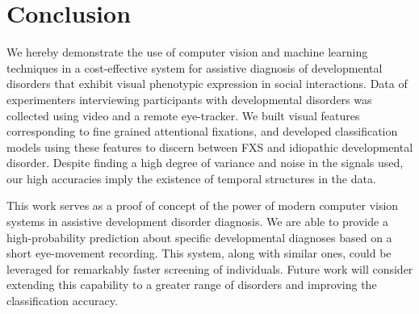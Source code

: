 \documentclass{llncs}
\begin{document}
\vspace*{-\baselineskip}
\section{Conclusion}
\vspace*{-\baselineskip}
We hereby demonstrate the use of computer vision and machine learning techniques in a cost-effective system for assistive diagnosis of developmental disorders that exhibit visual phenotypic expression in social interactions. Data of experimenters interviewing participants with developmental disorders was collected using video and a remote eye-tracker. We built visual features corresponding to fine grained attentional fixations, and developed classification models using these features to discern between FXS and idiopathic developmental disorder. Despite finding a high degree of variance and noise in the signals used, our high accuracies imply the existence of temporal structures in the data.

This work serves as a proof of concept of the power of modern computer vision systems in assistive development disorder diagnosis. We are able to provide a high-probability prediction about specific developmental diagnoses based on a short eye-movement recording. This system, along with similar ones, could be leveraged for remarkably faster screening of individuals. Future work will consider extending this capability to a greater range of disorders and improving the classification accuracy.
  \vspace*{-\baselineskip}
  
  
\end{document}
